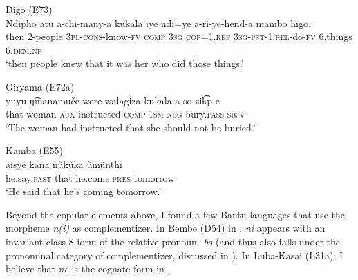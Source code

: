 \documentclass[output=paper,colorlinks,citecolor=brown,
]{langscibook}
\begin{document}
\ea
	\begin{xlist}
	\ex Digo (E73) \citep[55]{Nicolle:2014} \\
	\gll Ndipho atu a-chi-many-a kukala iye ndi=ye a-ri-ye-hend-a mambo higo. \\
	then 2-people 3\textsc{pl}-\textsc{cons}-know-\textsc{fv} \textsc{comp} 3\textsc{sg} \textsc{cop}=1.\textsc{ref} 3\textsc{sg}-\textsc{pst}-1.\textsc{rel}-do-\textsc{fv} 6.things 6.\textsc{dem.np}\\
	\glt `then people knew that it was her who did those things.'  
	
	\ex Giryama (E72a) \citep[273]{Lax:1996} \\
	\gll yuyu ŋ͡manamu\v{c}e were walagiza kukala a-so-zik͡p-e\\
	that woman \textsc{aux} instructed \textsc{comp} 1\textsc{sm}-\textsc{neg}-bury.\textsc{pass}-\textsc{sbjv}\\
	\glt `The woman had instructed that she should not be buried.' 
	
	\ex Kamba (E55) \citep[186]{Myers:1975} \\
	\gll aisye kana n\~uk\~uka \~um\~unthi\\
	he.say.\textsc{past} that he.come.\textsc{pres} tomorrow\\
	\glt `He said that he's coming tomorrow.'
	\end{xlist}
\z
%



Beyond the copular elements above, I found a few Bantu languages that use the morpheme \textit{n(i)} as complementizer. In Bembe (D54) in , \textit{ni} appears with an invariant class 8 form of the relative pronoun \textit{-bo} (and thus also falls under the pronominal category of complementizer, discussed in ). In Luba-Kasai (L31a), I believe that \textit{ne} is the cognate form in . 
\end{document}
